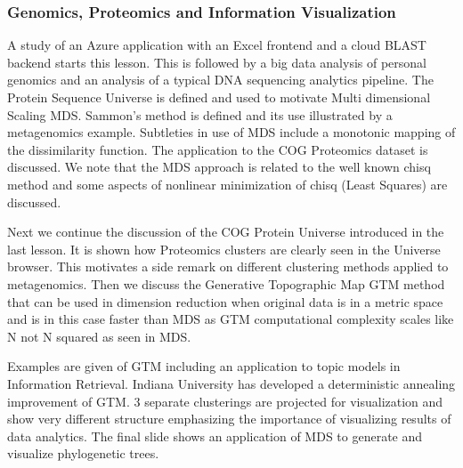 

\subsubsection{Genomics, Proteomics and Information
Visualization}\label{genomics-proteomics-and-information-visualization}

A study of an Azure application with an Excel frontend and a cloud BLAST
backend starts this lesson. This is followed by a big data analysis of
personal genomics and an analysis of a typical DNA sequencing analytics
pipeline. The Protein Sequence Universe is defined and used to motivate
Multi dimensional Scaling MDS. Sammon's method is defined and its use
illustrated by a metagenomics example. Subtleties in use of MDS include
a monotonic mapping of the dissimilarity function. The application to
the COG Proteomics dataset is discussed. We note that the MDS approach
is related to the well known chisq method and some aspects of nonlinear
minimization of chisq (Least Squares) are discussed.




Next we continue the discussion of the COG Protein Universe introduced
in the last lesson. It is shown how Proteomics clusters are clearly seen
in the Universe browser. This motivates a side remark on different
clustering methods applied to metagenomics. Then we discuss the
Generative Topographic Map GTM method that can be used in dimension
reduction when original data is in a metric space and is in this case
faster than MDS as GTM computational complexity scales like N not N
squared as seen in MDS.

Examples are given of GTM including an application to topic models in
Information Retrieval. Indiana University has developed a deterministic
annealing improvement of GTM. 3 separate clusterings are projected for
visualization and show very different structure emphasizing the
importance of visualizing results of data analytics. The final slide
shows an application of MDS to generate and visualize phylogenetic
trees.


